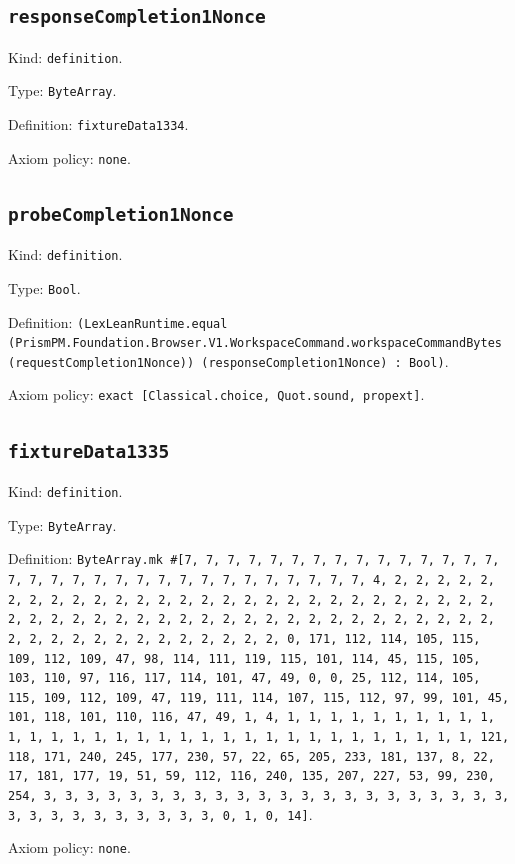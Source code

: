 \documentclass[11pt]{article}
\begin{document}
\subsection*{\texttt{responseCompletion1Nonce}}
\noindent Kind: \texttt{definition}.\par
\noindent Type: \texttt{ByteArray}.\par
\noindent Definition: \texttt{fixtureData1334}.\par
\noindent Axiom policy: \texttt{none}.\par
\subsection*{\texttt{probeCompletion1Nonce}}
\noindent Kind: \texttt{definition}.\par
\noindent Type: \texttt{Bool}.\par
\noindent Definition: \texttt{(LexLeanRuntime.equal (PrismPM.Foundation.Browser.V1.WorkspaceCommand.workspaceCommandBytes (requestCompletion1Nonce)) (responseCompletion1Nonce) : Bool)}.\par
\noindent Axiom policy: \texttt{exact [Classical.choice, Quot.sound, propext]}.\par
\subsection*{\texttt{fixtureData1335}}
\noindent Kind: \texttt{definition}.\par
\noindent Type: \texttt{ByteArray}.\par
\noindent Definition: \texttt{ByteArray.mk \#[7, 7, 7, 7, 7, 7, 7, 7, 7, 7, 7, 7, 7, 7, 7, 7, 7, 7, 7, 7, 7, 7, 7, 7, 7, 7, 7, 7, 7, 7, 7, 7, 4, 2, 2, 2, 2, 2, 2, 2, 2, 2, 2, 2, 2, 2, 2, 2, 2, 2, 2, 2, 2, 2, 2, 2, 2, 2, 2, 2, 2, 2, 2, 2, 2, 2, 2, 2, 2, 2, 2, 2, 2, 2, 2, 2, 2, 2, 2, 2, 2, 2, 2, 2, 2, 2, 2, 2, 2, 2, 2, 2, 2, 2, 2, 2, 2, 0, 171, 112, 114, 105, 115, 109, 112, 109, 47, 98, 114, 111, 119, 115, 101, 114, 45, 115, 105, 103, 110, 97, 116, 117, 114, 101, 47, 49, 0, 0, 25, 112, 114, 105, 115, 109, 112, 109, 47, 119, 111, 114, 107, 115, 112, 97, 99, 101, 45, 101, 118, 101, 110, 116, 47, 49, 1, 4, 1, 1, 1, 1, 1, 1, 1, 1, 1, 1, 1, 1, 1, 1, 1, 1, 1, 1, 1, 1, 1, 1, 1, 1, 1, 1, 1, 1, 1, 1, 1, 1, 121, 118, 171, 240, 245, 177, 230, 57, 22, 65, 205, 233, 181, 137, 8, 22, 17, 181, 177, 19, 51, 59, 112, 116, 240, 135, 207, 227, 53, 99, 230, 254, 3, 3, 3, 3, 3, 3, 3, 3, 3, 3, 3, 3, 3, 3, 3, 3, 3, 3, 3, 3, 3, 3, 3, 3, 3, 3, 3, 3, 3, 3, 3, 3, 0, 1, 0, 14]}.\par
\noindent Axiom policy: \texttt{none}.\par
\end{document}
